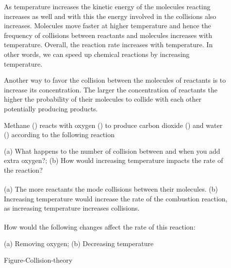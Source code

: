 \documentclass[main.tex]{subfiles}
\begin{document}
\begin{description}
\item[] 
As temperature increases the kinetic energy of the molecules reacting increases as well and with this the energy involved in the collisions also increases. Molecules move faster at higher temperature and hence the frequency of collisions between reactants and molecules increases with temperature. Overall, the reaction rate increases with temperature. In other words, we can speed up chemical reactions by increasing temperature.
\item[] 
Another way to favor the collision between the molecules of reactants is to increase its concentration. The larger the concentration of reactants the higher the probability of their molecules to collide with each other potentially producing products.

\begin{example} %
Methane () reacts with oxygen () to produce carbon dioxide () and water () according to the following reaction
\begin{center}\end{center}
(a) What happens to the number of collision between  and  when you add extra oxygen?; (b) How would increasing temperature impacts the rate of the reaction?\\
\\
(a) The more reactants the mode collisions between their molecules. (b) Increasing temperature would increase the rate of the combustion reaction, as increasing temperature increases collisions. 
\\
\faDiamond\ \\
How would the following changes affect the rate of this reaction:
\begin{center}\end{center}
 (a) Removing oxygen; (b) Decreasing temperature
\\
\end{example}%
\hspace{4cm}\vspace{3cm}  {Figure-Collision-theory} \newpage


\end{description}
\end{document}
